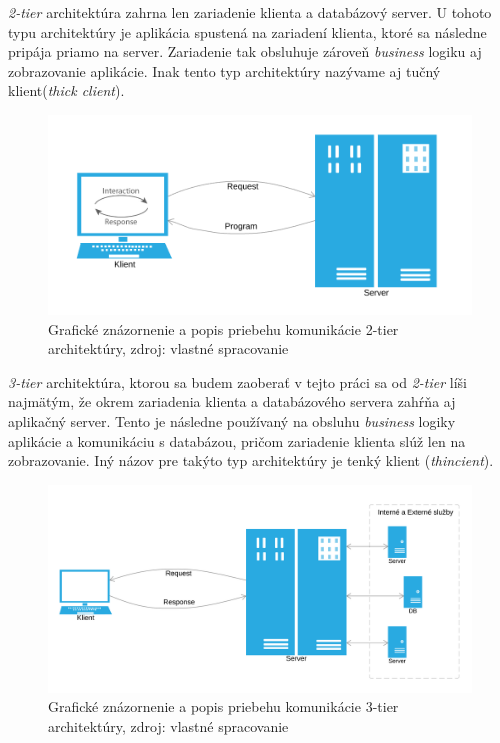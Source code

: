 \documentclass[
  printed, %
  table,   %
  lof,     %
  lot,     %
]{fithesis3}
\begin{document}
\textit{2-tier} architektúra zahrna len zariadenie klienta a databázový server.
U tohoto typu architektúry je aplikácia spustená na zariadení klienta, ktoré sa
následne pripája priamo na server. Zariadenie tak obsluhuje zároveň
\textit{business} logiku aj zobrazovanie aplikácie. Inak tento typ architektúry
nazývame aj tučný klient(\textit{thick client}).

\begin{figure}[H]
  \centering
    \includegraphics[width=\textwidth]{images/C-S-thick.png}
  \caption{Grafické znázornenie a popis priebehu komunikácie 2-tier architektúry,
  zdroj: vlastné spracovanie}
  \label{fig:cs-thick}
\end{figure}

\textit{3-tier} architektúra, ktorou sa budem zaoberať v tejto práci sa od
\textit{2-tier} líši najmätým, že okrem zariadenia klienta a databázového servera
zahŕňa aj aplikačný server. Tento je následne používaný na obsluhu
\textit{business} logiky aplikácie a komunikáciu s databázou, pričom zariadenie
klienta slúž len na zobrazovanie. Iný názov pre takýto typ architektúry je tenký
klient (\textit{thincient}).

\begin{figure}[H]
  \centering
    \includegraphics[width=\textwidth]{images/C-S-thin.png}
  \caption{Grafické znázornenie a popis priebehu komunikácie 3-tier architektúry,
  zdroj: vlastné spracovanie}
  \label{fig:cs-thin}
\end{figure}
\end{document}
